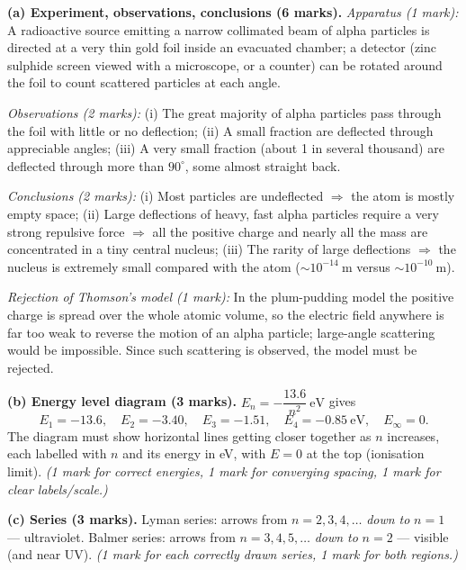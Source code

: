 \documentclass[11pt]{article}
\newcommand{\cle}[1]{{\popxbold\color{popdark}#1}}
\begin{document}
\begin{corrige}
\textbf{(a) Experiment, observations, conclusions (6 marks).}
\emph{Apparatus (1 mark):} A radioactive source emitting a narrow collimated beam of alpha particles is directed at a very thin gold foil inside an evacuated chamber; a detector (zinc sulphide screen viewed with a microscope, or a counter) can be rotated around the foil to count scattered particles at each angle.

\emph{Observations (2 marks):} (i) The great majority of alpha particles pass through the foil with little or no deflection; (ii) A small fraction are deflected through appreciable angles; (iii) A very small fraction (about 1 in several thousand) are deflected through more than $90^{\circ}$, some almost straight back.

\emph{Conclusions (2 marks):} (i) Most particles are undeflected $\Rightarrow$ the atom is mostly empty space; (ii) Large deflections of heavy, fast alpha particles require a very strong repulsive force $\Rightarrow$ all the positive charge and nearly all the mass are concentrated in a tiny central \cle{nucleus}; (iii) The rarity of large deflections $\Rightarrow$ the nucleus is extremely small compared with the atom ($\sim 10^{-14}\ \mathrm{m}$ versus $\sim 10^{-10}\ \mathrm{m}$).

\emph{Rejection of Thomson's model (1 mark):} In the plum-pudding model the positive charge is spread over the whole atomic volume, so the electric field anywhere is far too weak to reverse the motion of an alpha particle; large-angle scattering would be impossible. Since such scattering is observed, the model must be rejected.

\textbf{(b) Energy level diagram (3 marks).} $E_n = -\dfrac{13.6}{n^{2}}\ \mathrm{eV}$ gives
\[ E_1 = -13.6,\quad E_2 = -3.40,\quad E_3 = -1.51,\quad E_4 = -0.85\ \mathrm{eV},\quad E_{\infty} = 0. \]
The diagram must show horizontal lines getting closer together as $n$ increases, each labelled with $n$ and its energy in eV, with $E = 0$ at the top (ionisation limit). \emph{(1 mark for correct energies, 1 mark for converging spacing, 1 mark for clear labels/scale.)}

\textbf{(c) Series (3 marks).} Lyman series: arrows from $n = 2, 3, 4, \dots$ \emph{down to} $n = 1$ — ultraviolet. Balmer series: arrows from $n = 3, 4, 5, \dots$ \emph{down to} $n = 2$ — visible (and near UV). \emph{(1 mark for each correctly drawn series, 1 mark for both regions.)}


\end{corrige}
\end{document}
